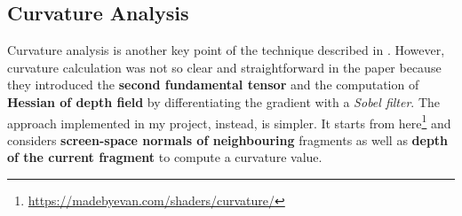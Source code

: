 \subsection{Curvature Analysis}
Curvature analysis is another key point of the technique described in \cite{referencePaper}. \newline
However, curvature calculation was not so clear and straightforward in the paper because they introduced the \textbf{second fundamental tensor} and the computation of \textbf{Hessian of depth field} by differentiating the gradient with a \textit{Sobel filter}. \newline
The approach implemented in my project, instead, is simpler. It starts from here\footnote{\url{https://madebyevan.com/shaders/curvature/}} and considers \textbf{screen-space normals of neighbouring} fragments as well as \textbf{depth of the current fragment} to compute a curvature value.
